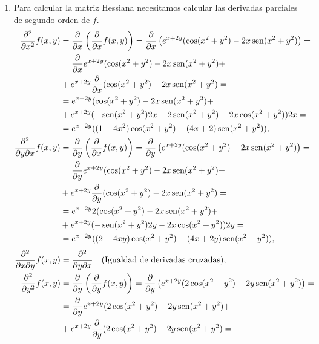 {\begin{enumerate}
\item Para calcular la matriz Hessiana necesitamos calcular las derivadas parciales de segundo orden de $f$.
\begin{align*}
\frac{\partial^{2}}{\partial x^{2}}f(x,y) &= \frac{\partial}{\partial x}\left(\frac{\partial}{\partial x}f(x,y)\right) = \frac{\partial}{\partial x}\left(e^{x+2y}(\cos(x^{2}+y^{2})-2x\operatorname{sen}(x^{2}+y^{2})\right) = \\
&= \frac{\partial}{\partial x}e^{x+2y}(\cos(x^{2}+y^{2})-2x\operatorname{sen}(x^{2}+y^{2})+\\
&+ e^{x+2y}\frac{\partial}{\partial x}(\cos(x^{2}+y^{2})-2x\operatorname{sen}(x^{2}+y^{2}) = \\
&= e^{x+2y}(\cos(x^{2}+y^{2})-2x\operatorname{sen}(x^{2}+y^{2})+\\
&+ e^{x+2y}(-\operatorname{sen}(x^{2}+y^{2})2x-2\operatorname{sen}(x^{2}+y^{2})-2x\cos(x^{2}+y^{2}))2x = \\
&= e^{x+2y}((1-4x^{2})\cos(x^{2}+y^{2})-(4x+2)\operatorname{sen}(x^{2}+y^{2})),\\
\frac{\partial^{2}}{\partial y\partial x}f(x,y) &= \frac{\partial}{\partial y}\left(\frac{\partial}{\partial x}f(x,y)\right) = \frac{\partial}{\partial y}\left(e^{x+2y}(\cos(x^{2}+y^{2})-2x\operatorname{sen}(x^{2}+y^{2})\right) = \\
&= \frac{\partial}{\partial y}e^{x+2y}(\cos(x^{2}+y^{2})-2x\operatorname{sen}(x^{2}+y^{2})+\\
&+ e^{x+2y}\frac{\partial}{\partial y}(\cos(x^{2}+y^{2})-2x\operatorname{sen}(x^{2}+y^{2}) = \\
&= e^{x+2y}2(\cos(x^{2}+y^{2})-2x\operatorname{sen}(x^{2}+y^{2})+\\
&+ e^{x+2y}(-\operatorname{sen}(x^{2}+y^{2})2y-2x\cos(x^{2}+y^{2}))2y = \\
&= e^{x+2y}((2-4xy)\cos(x^{2}+y^{2})-(4x+2y)\operatorname{sen}(x^{2}+y^{2})),\\
\end{align*}
\begin{align*}
\frac{\partial^{2}}{\partial x\partial y}f(x,y) &= \frac{\partial^{2}}{\partial y\partial x}\quad \mbox{(Igualdad de derivadas cruzadas),}\\
%
\frac{\partial^{2}}{\partial y^{2}}f(x,y) &= \frac{\partial}{\partial y}\left(\frac{\partial}{\partial y}f(x,y)\right) = \frac{\partial}{\partial y}\left(e^{x+2y}(2\cos(x^{2}+y^{2})-2y\sen(x^{2}+y^{2})\right) = \\
&= \frac{\partial}{\partial y}e^{x+2y}(2\cos(x^{2}+y^{2})-2y\sen(x^{2}+y^{2})+\\
&+ e^{x+2y}\frac{\partial}{\partial y}(2\cos(x^{2}+y^{2})-2y\sen(x^{2}+y^{2}) = \\

\end{align*}
\end{enumerate}}
